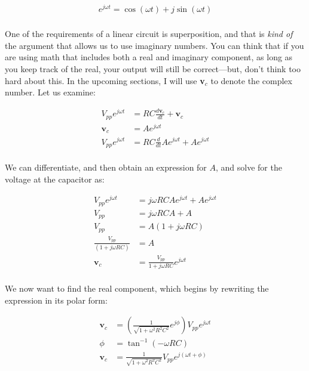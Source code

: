 \documentclass[12pt]{report}
\newcommand{\pr}[1]{\left(#1\right)}
\newcommand{\Vpp}{{ V}_{ pp}}
\begin{document}
\begin{equation} \label{imag1}
\begin{split}
e^{j\omega t} = \cos(\omega t) + j\sin(\omega t) \\
\end{split}
\end{equation}

One of the requirements of a linear circuit is superposition, and that is \textit{kind of} the argument that allows us to use imaginary numbers. You can think that if you are using math that includes both a real and imaginary component, as long as you keep track of the real, your output will still be correct---but, don't think too hard about this. In the upcoming sections, I will use \textbf{v}$_c$ to denote the complex number. Let us examine: 

\begin{equation} \label{imag2}
\begin{split}
\Vpp e^{j\omega t} &= RC\frac{d\textbf{v}_c}{dt} + \textbf{v}_c \\
\textbf{v}_c &= Ae^{j\omega t} \\
\Vpp e^{j\omega t} &= RC\frac{d}{dt}Ae^{j\omega t} + Ae^{j\omega t} \\
\end{split}
\end{equation}

We can differentiate, and then obtain an expression for $A$, and solve for the voltage at the capacitor as:

\begin{equation} \label{imag3}
\begin{split}
\Vpp e^{j\omega t} &= j\omega RCAe^{j\omega t} + Ae^{j\omega t} \\
\Vpp &= j\omega RCA + A \\
\Vpp &= A\pr{1 + j\omega RC}\\
\frac{\Vpp}{\pr{1 + j\omega RC}} &= A\\
\textbf{v}_c &= \frac{\Vpp}{1 + j\omega RC}e^{j\omega t} \\
\end{split}
\end{equation}

We now want to find the real component, which begins by rewriting the expression in its polar form: 

\begin{equation} \label{imag4}
\begin{split}
\textbf{v}_c &= \pr{\frac{1}{\sqrt{1 + \omega^2 R^2C^2}}e^{j\phi}}\Vpp e^{j\omega t} \\
\phi &= \tan^{-1}(-\omega RC) \\
\textbf{v}_c &= \frac{1}{\sqrt{1 + \omega^2 R^2C^2}}\Vpp e^{j(\omega t + \phi)} \\
\end{split}
\end{equation}
\end{document}
